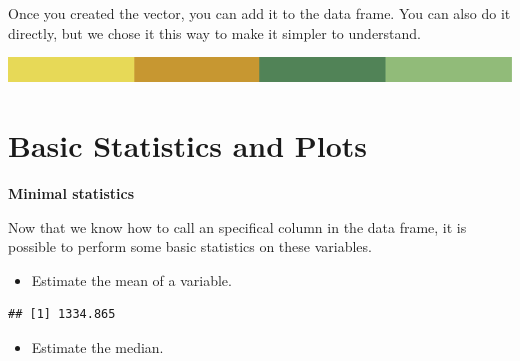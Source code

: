 \documentclass[
]{book}
\newenvironment{Shaded}{\begin{snugshade}}{\end{snugshade}}
\newcommand{\FunctionTok}[1]{\textcolor[rgb]{0.00,0.00,0.00}{#1}}
\newcommand{\NormalTok}[1]{#1}
\newcommand{\OtherTok}[1]{\textcolor[rgb]{0.56,0.35,0.01}{#1}}
\newcommand{\SpecialCharTok}[1]{\textcolor[rgb]{0.00,0.00,0.00}{#1}}
\providecommand{\tightlist}{%
  \setlength{\itemsep}{0pt}\setlength{\parskip}{0pt}}
\begin{document}
Once you created the vector, you can add it to the data frame. You can also do it directly, but we chose it this way to make it simpler to understand.

\begin{Shaded}
\end{Shaded}

\includegraphics{rsrstrip.png}

\hypertarget{basic-statistics-and-plots}{%
\section{Basic Statistics and Plots}\label{basic-statistics-and-plots}}

\textbf{Minimal statistics}

Now that we know how to call an specifical column in the data frame, it is possible to perform some basic statistics on these variables.

\begin{itemize}
\tightlist
\item
  Estimate the mean of a variable.
\end{itemize}

\begin{Shaded}
\end{Shaded}

\begin{verbatim}
## [1] 1334.865
\end{verbatim}

\begin{itemize}
\tightlist
\item
  Estimate the median.
\end{itemize}

\begin{Shaded}
\end{Shaded}
\end{document}
